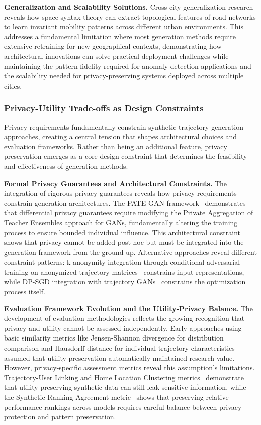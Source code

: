 \documentclass[runningheads]{llncs}
\begin{document}
\textbf{Generalization and Scalability Solutions.} Cross-city generalization research~\cite{wang2025gtg} reveals how space syntax theory can extract topological features of road networks to learn invariant mobility patterns across different urban environments. This addresses a fundamental limitation where most generation methods require extensive retraining for new geographical contexts, demonstrating how architectural innovations can solve practical deployment challenges while maintaining the pattern fidelity required for anomaly detection applications and the scalability needed for privacy-preserving systems deployed across multiple cities.

\subsubsection{Privacy-Utility Trade-offs as Design Constraints}

Privacy requirements fundamentally constrain synthetic trajectory generation approaches, creating a central tension that shapes architectural choices and evaluation frameworks. Rather than being an additional feature, privacy preservation emerges as a core design constraint that determines the feasibility and effectiveness of generation methods.

\textbf{Formal Privacy Guarantees and Architectural Constraints.} The integration of rigorous privacy guarantees reveals how privacy requirements constrain generation architectures. The PATE-GAN framework~\cite{jordon2019pate} demonstrates that differential privacy guarantees require modifying the Private Aggregation of Teacher Ensembles approach for GANs, fundamentally altering the training process to ensure bounded individual influence. This architectural constraint shows that privacy cannot be added post-hoc but must be integrated into the generation framework from the ground up. Alternative approaches reveal different constraint patterns: k-anonymity integration through conditional adversarial training on anonymized trajectory matrices~\cite{rao2023cats} constrains input representations, while DP-SGD integration with trajectory GANs~\cite{merhi2024synthetic} constrains the optimization process itself.

\textbf{Evaluation Framework Evolution and the Utility-Privacy Balance.} The development of evaluation methodologies reflects the growing recognition that privacy and utility cannot be assessed independently. Early approaches using basic similarity metrics like Jensen-Shannon divergence for distribution comparison and Hausdorff distance for individual trajectory characteristics~\cite{kong2023mobility} assumed that utility preservation automatically maintained research value. However, privacy-specific assessment metrics reveal this assumption's limitations. Trajectory-User Linking and Home Location Clustering metrics~\cite{rao2023cats} demonstrate that utility-preserving synthetic data can still leak sensitive information, while the Synthetic Ranking Agreement metric~\cite{jordon2019pate} shows that preserving relative performance rankings across models requires careful balance between privacy protection and pattern preservation.
\end{document}
